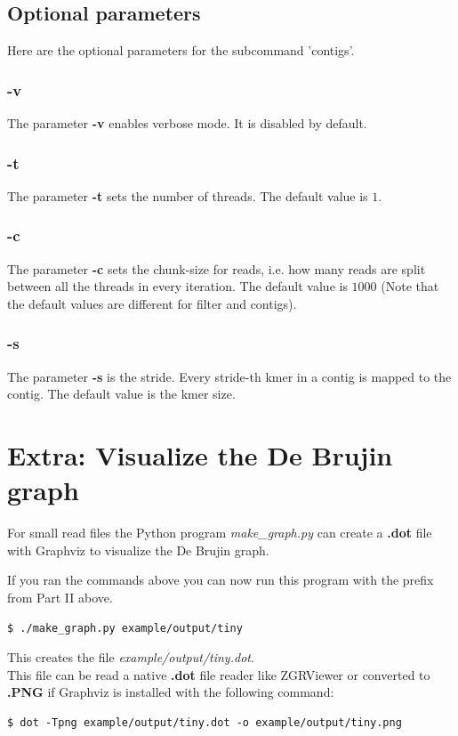 \documentclass[a4paper]{report}
\renewcommand{\b}[1]{\textbf{#1}}  %
\newcommand{\e}[1]{\emph{#1}}    %
\begin{document}
\subsection{Optional parameters}

Here are the optional parameters for the subcommand 'contigs'.

\subsubsection{\b{-v}}
The parameter \b{-v} enables verbose mode. It is disabled by default.
\subsubsection{\b{-t}}
The parameter \b{-t} sets the number of threads. The default value is $1$.
\subsubsection{\b{-c}}
The parameter \b{-c} sets the chunk-size for reads, i.e. how many reads are split between all the threads in every iteration. 
The default value is $1000$ (Note that the default values are different for filter and contigs).
\subsubsection{\b{-s}}
The parameter \b{-s} is the stride. Every stride-th kmer in a contig is mapped to the contig. The default value is the kmer size. 
\section{Extra: Visualize the De Brujin graph}
For small read files the Python program \e{make\_graph.py} can create a \b{.dot} file with Graphviz\cite{graphviz} 
to visualize the De Brujin graph.

If you ran the commands above you can now run this program with the prefix from Part II above.
\begin{verbatim}
$ ./make_graph.py example/output/tiny
\end{verbatim}

This creates the file \e{example/output/tiny.dot}.\\[4pt]

This file can be read a native \b{.dot} file reader like ZGRViewer\cite{zgr} or converted to \b{.PNG} if Graphviz is installed with the following command:
\begin{verbatim}
$ dot -Tpng example/output/tiny.dot -o example/output/tiny.png
\end{verbatim}
\end{document}
